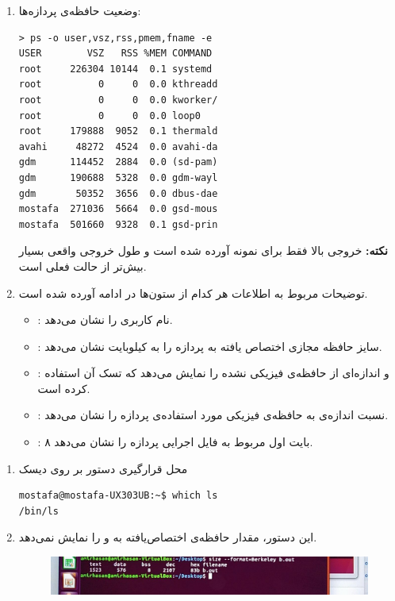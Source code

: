 \begin{enumerate}
	\item وضعیت حافظه‌ی پردازه‌ها:
	
	\begin{Verbatim}[tabsize=4]
> ps -o user,vsz,rss,pmem,fname -e                                       
USER        VSZ   RSS %MEM COMMAND
root     226304 10144  0.1 systemd
root          0     0  0.0 kthreadd
root          0     0  0.0 kworker/
root          0     0  0.0 loop0
root     179888  9052  0.1 thermald
avahi     48272  4524  0.0 avahi-da
gdm      114452  2884  0.0 (sd-pam)
gdm      190688  5328  0.0 gdm-wayl
gdm       50352  3656  0.0 dbus-dae
mostafa  271036  5664  0.0 gsd-mous
mostafa  501660  9328  0.1 gsd-prin
	\end{Verbatim}
	\textbf{نکته:} خروجی بالا فقط برای نمونه آورده شده است و طول خروجی واقعی بسیار بیش‌تر از حالت فعلی است.
	\item توضیحات مربوط به  اطلاعات هر کدام از ستون‌ها در ادامه آورده شده است.
	
	\begin{itemize}
		\item \textbf{}:
	نام کاربری را نشان می‌دهد.
		\item \textbf{}:
		سایز حافظه مجازی اختصاص یافته به پردازه را به کیلوبایت نشان می‌دهد.
		\item \textbf{}:
		 و اندازه‌ای از حافظه‌ی فیزیکی  نشده را نمایش می‌دهد که تسک آن استفاده کرده است.
		\item \textbf{}:
		نسبت اندازه‌ی  به حافظه‌ی فیزیکی مورد استفاده‌ی پردازه را نشان می‌دهد.
		\item \textbf{}:
	۸ بایت اول  مربوط به فایل اجرایی پردازه را نشان می‌دهد. 
	\end{itemize}
\end{enumerate}

\newpage

\begin{enumerate}
	\item محل قرارگیری دستور  بر روی دیسک
	\begin{Verbatim}
mostafa@mostafa-UX303UB:~$ which ls
/bin/ls
	\end{Verbatim}
	
	\item 
	این دستور، مقدار حافظه‌ی اختصاص‌یافته به  و  را نمایش نمی‌دهد.
	
	\begin{figure}[!hpbt]
		\centering
		\includegraphics[scale=0.3]{./img/3.jpeg}
	\end{figure}
\end{enumerate}

